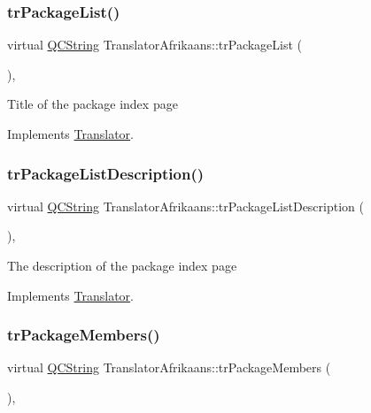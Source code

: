 \subsubsection{\texorpdfstring{trPackageList()}{trPackageList()}}
{\footnotesize\ttfamily virtual \mbox{\hyperlink{class_q_c_string}{Q\+C\+String}} Translator\+Afrikaans\+::tr\+Package\+List (\begin{DoxyParamCaption}{ }\end{DoxyParamCaption})\hspace{0.3cm}{\ttfamily [inline]}, {\ttfamily [virtual]}}

Title of the package index page 

Implements \mbox{\hyperlink{class_translator}{Translator}}.

\mbox{\label{class_translator_afrikaans_a4e5ecc6dc8de34d256af2bbd0523b535}} 
\subsubsection{\texorpdfstring{trPackageListDescription()}{trPackageListDescription()}}
{\footnotesize\ttfamily virtual \mbox{\hyperlink{class_q_c_string}{Q\+C\+String}} Translator\+Afrikaans\+::tr\+Package\+List\+Description (\begin{DoxyParamCaption}{ }\end{DoxyParamCaption})\hspace{0.3cm}{\ttfamily [inline]}, {\ttfamily [virtual]}}

The description of the package index page 

Implements \mbox{\hyperlink{class_translator}{Translator}}.

\mbox{\label{class_translator_afrikaans_a0c228930291219947a1f82db08f5e824}} 
\subsubsection{\texorpdfstring{trPackageMembers()}{trPackageMembers()}}
{\footnotesize\ttfamily virtual \mbox{\hyperlink{class_q_c_string}{Q\+C\+String}} Translator\+Afrikaans\+::tr\+Package\+Members (\begin{DoxyParamCaption}{ }\end{DoxyParamCaption})\hspace{0.3cm}{\ttfamily [inline]}, {\ttfamily [virtual]}}

